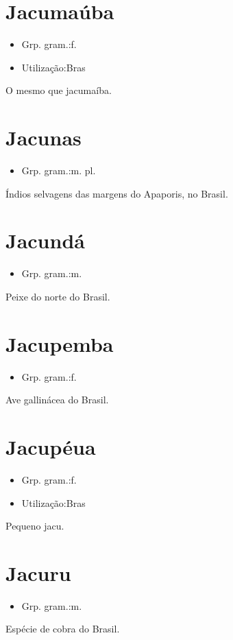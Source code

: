 \documentclass{article}
\begin{document}
\section{Jacumaúba}
\begin{itemize}
\item {Grp. gram.:f.}
\end{itemize}
\begin{itemize}
\item {Utilização:Bras}
\end{itemize}
O mesmo que \textunderscore jacumaíba\textunderscore .
\section{Jacunas}
\begin{itemize}
\item {Grp. gram.:m. pl.}
\end{itemize}
Índios selvagens das margens do Apaporis, no Brasil.
\section{Jacundá}
\begin{itemize}
\item {Grp. gram.:m.}
\end{itemize}
Peixe do norte do Brasil.
\section{Jacupemba}
\begin{itemize}
\item {Grp. gram.:f.}
\end{itemize}
Ave gallinácea do Brasil.
\section{Jacupéua}
\begin{itemize}
\item {Grp. gram.:f.}
\end{itemize}
\begin{itemize}
\item {Utilização:Bras}
\end{itemize}
Pequeno jacu.
\section{Jacuru}
\begin{itemize}
\item {Grp. gram.:m.}
\end{itemize}
Espécie de cobra do Brasil.
\end{document}
